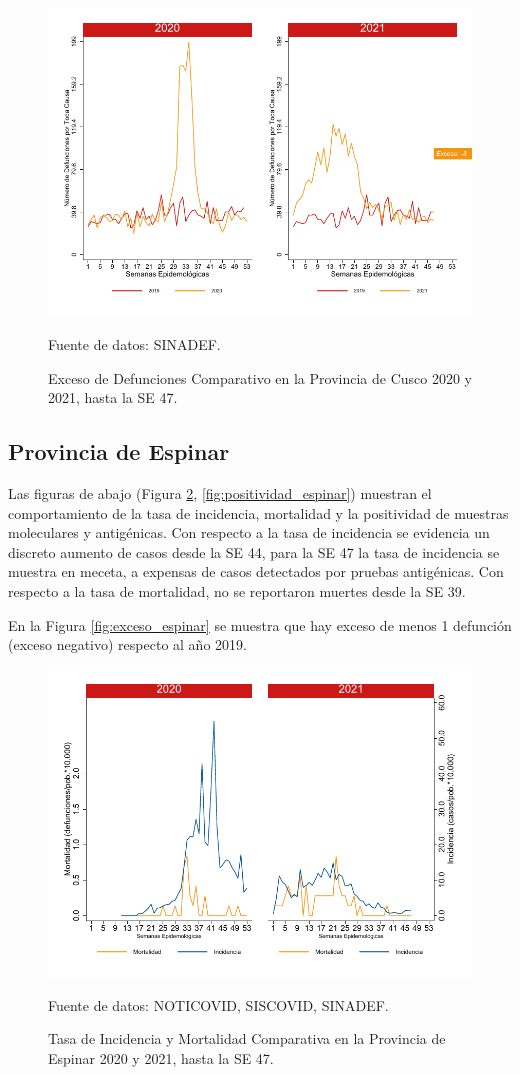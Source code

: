 \documentclass[12pt,a4paper,openany]{book}
\begin{document}
		\begin{figure}[h]
			\caption{Exceso de Defunciones Comparativo en la Provincia de Cusco  2020 y 2021, hasta la SE 47.}\label{fig:exceso_cusco}
			\begin{center}
				\includegraphics[width=0.7\linewidth]{../figuras/exceso_7}
			\end{center}
			{\footnotesize {Fuente de datos: SINADEF.}}
		\end{figure}
		
		\clearpage
		
		\subsection*{Provincia de Espinar}
		\noindent Las figuras de abajo (Figura \ref{fig:inc_mort_espinar}, \ref{fig:positividad_espinar}) muestran el comportamiento de la tasa de incidencia, mortalidad y la positividad de muestras moleculares y antigénicas. Con respecto a la tasa de incidencia se evidencia un discreto aumento de casos desde la SE 44, para la SE 47 la tasa de incidencia se muestra en meceta, a expensas de casos detectados por pruebas antigénicas. Con respecto a la tasa de mortalidad, no se reportaron muertes desde la SE 39. 
		
		En la Figura \ref{fig:exceso_espinar} se muestra que hay exceso de  menos 1 defunción (exceso negativo) respecto al año 2019.
		
		\begin{figure}[h]
			\caption{Tasa de Incidencia y Mortalidad Comparativa en la Provincia de Espinar 2020 y 2021, hasta la SE 47.}\label{fig:inc_mort_espinar}
			\begin{center}
				\includegraphics[width=0.7\linewidth]{../figuras/incidencia_mortalidad_20_21_8}
			\end{center}
			{\footnotesize {Fuente de datos: NOTICOVID, SISCOVID, SINADEF.}}
		\end{figure}
		
\end{document}
